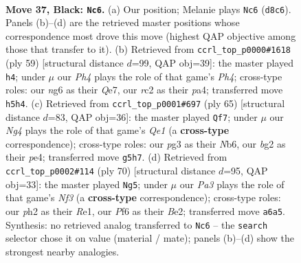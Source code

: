 \documentclass[11pt]{article}
\begin{document}
\clearpage

\begin{figure}[p]\centering
\begin{subfigure}{0.46\textwidth}\centering
\resizebox{\linewidth}{!}{%
\newchessgame
\chessboard[
  setfen={r2n4/1p4p1/pk3pN1/6np/2QR4/4P1P1/PPR2PBP/6K1 b - - 4 37},
  showmover=false,
  pgfstyle=straightmove, color=movearrow, markmove={d8-c6}
]}
\caption{}
\end{subfigure}\hfill
\begin{subfigure}{0.46\textwidth}\centering
\resizebox{\linewidth}{!}{%
\newchessgame
\chessboard[
  setfen={8/kp2qp2/2p1n1nr/p6p/P1R5/4P1P1/1PQ1NP2/6KB b - - 15 30},
  showmover=false,
  pgfstyle=straightmove, color=movearrow, markmove={h5-h4}
]}
\caption{}
\end{subfigure}
\\[4pt]
\begin{subfigure}{0.46\textwidth}\centering
\resizebox{\linewidth}{!}{%
\newchessgame
\chessboard[
  setfen={2r1q2k/p5p1/1n2pp1p/8/4P1Q1/P1B3RP/5PP1/6K1 b - - 5 33},
  showmover=false,
  pgfstyle=straightmove, color=movearrow, markmove={e8-f7}
]}
\caption{}
\end{subfigure}\hfill
\begin{subfigure}{0.46\textwidth}\centering
\resizebox{\linewidth}{!}{%
\newchessgame
\chessboard[
  setfen={6k1/rqp2pbp/4r1p1/P7/Q7/1p2PN2/1P2BPPP/4R1K1 w - - 2 36},
  showmover=false,
  pgfstyle=straightmove, color=movearrow, markmove={f3-g5}
]}
\caption{}
\end{subfigure}
\caption{\textbf{Move 37, Black: \texttt{Nc6}.} (a) Our position; Melanie plays \texttt{Nc6} (\texttt{d8c6}). Panels (b)--(d) are the retrieved master positions whose correspondence most drove this move (highest QAP objective among those that transfer to it). (b) Retrieved from \texttt{ccrl\_top\_p0000\#1618} (ply 59) [structural distance $d$=99, QAP obj=39]: the master played \texttt{h4}; under $\mu$ our \emph{Ph4} plays the role of that game's \emph{Ph4}; cross-type roles: our \emph{n}g6 as their \emph{Q}e7, our \emph{r}c2 as their \emph{p}a4; transferred move \texttt{h5h4}. (c) Retrieved from \texttt{ccrl\_top\_p0001\#697} (ply 65) [structural distance $d$=83, QAP obj=36]: the master played \texttt{Qf7}; under $\mu$ our \emph{Ng4} plays the role of that game's \emph{Qe1} (a \textbf{cross-type} correspondence); cross-type roles: our \emph{p}g3 as their \emph{N}b6, our \emph{b}g2 as their \emph{p}e4; transferred move \texttt{g5h7}. (d) Retrieved from \texttt{ccrl\_top\_p0002\#114} (ply 70) [structural distance $d$=95, QAP obj=33]: the master played \texttt{Ng5}; under $\mu$ our \emph{Pa3} plays the role of that game's \emph{Nf3} (a \textbf{cross-type} correspondence); cross-type roles: our \emph{p}h2 as their \emph{R}e1, our \emph{P}f6 as their \emph{B}e2; transferred move \texttt{a6a5}. Synthesis: no retrieved analog transferred to \texttt{Nc6} -- the \texttt{search} selector chose it on value (material / mate); panels (b)--(d) show the strongest nearby analogies.}
\label{fig:thought-m73}
\end{figure}
\end{document}
